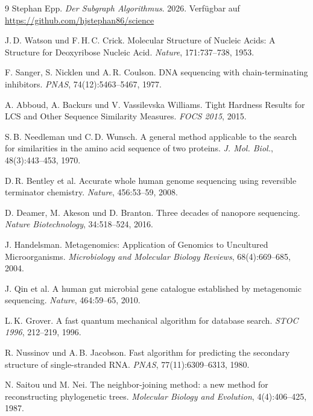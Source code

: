 ﻿\documentclass[a4paper,12pt]{article}
\theoremstyle{definition}
\begin{document}
\begin{thebibliography}{9}
    Stephan Epp.
    \textit{Der Subgraph Algorithmus}. 2026. Verfügbar auf
    \url{https://github.com/hjstephan86/science}

    J.\,D. Watson und F.\,H.\,C. Crick.
    Molecular Structure of Nucleic Acids: A Structure for Deoxyribose
    Nucleic Acid.
    \textit{Nature}, 171:737--738, 1953.
    
    F. Sanger, S. Nicklen und A.\,R. Coulson.
    DNA sequencing with chain-terminating inhibitors.
    \textit{PNAS}, 74(12):5463--5467, 1977.
    
    A. Abboud, A. Backurs und V. Vassilevska Williams.
    Tight Hardness Results for LCS and Other Sequence Similarity Measures.
    \textit{FOCS 2015}, 2015.
    
    S.\,B. Needleman und C.\,D. Wunsch.
    A general method applicable to the search for similarities in the
    amino acid sequence of two proteins.
    \textit{J. Mol. Biol.}, 48(3):443--453, 1970.
    
    D.\,R. Bentley et al.
    Accurate whole human genome sequencing using reversible terminator
    chemistry.
    \textit{Nature}, 456:53--59, 2008.
    
    D. Deamer, M. Akeson und D. Branton.
    Three decades of nanopore sequencing.
    \textit{Nature Biotechnology}, 34:518--524, 2016.
    
    J. Handelsman.
    Metagenomics: Application of Genomics to Uncultured Microorganisms.
    \textit{Microbiology and Molecular Biology Reviews}, 68(4):669--685, 2004.
    
    J. Qin et al.
    A human gut microbial gene catalogue established by metagenomic sequencing.
    \textit{Nature}, 464:59--65, 2010.
    
    L.\,K. Grover.
    A fast quantum mechanical algorithm for database search.
    \textit{STOC 1996}, 212--219, 1996.
    
    R. Nussinov und A.\,B. Jacobson.
    Fast algorithm for predicting the secondary structure of single-stranded RNA.
    \textit{PNAS}, 77(11):6309--6313, 1980.
    
    N. Saitou und M. Nei.
    The neighbor-joining method: a new method for reconstructing phylogenetic trees.
    \textit{Molecular Biology and Evolution}, 4(4):406--425, 1987.


\end{thebibliography}
\end{document}
